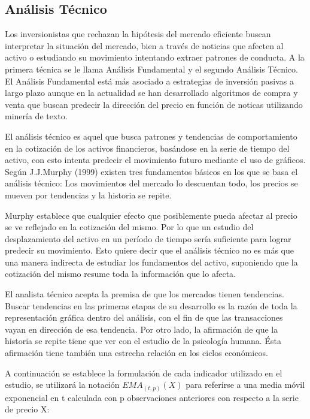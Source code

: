 \documentclass[a4paper,12pt]{Latex/Classes/PhDthesisPSnPDF}
\begin{document}
\subsection{Análisis Técnico}

Los inversionistas que rechazan la hipótesis del mercado eficiente buscan interpretar la situación del mercado, bien a través de noticias que afecten al activo o estudiando su movimiento intentando extraer patrones de conducta. A la primera técnica se le llama Análisis Fundamental y el segundo Análisis Técnico. El Análisis Fundamental está más asociado a estrategias de inversión pasivas a largo plazo aunque en la actualidad se han desarrollado algoritmos de compra y venta que buscan predecir la dirección del precio en función de noticas utilizando minería de texto.

El análisis técnico es aquel que busca patrones y tendencias de comportamiento en la cotización de los activos financieros, basándose en la serie de tiempo del activo, con esto intenta predecir el movimiento futuro mediante el uso de gráficos. Según J.J.Murphy (1999) existen tres fundamentos básicos en los que se basa el análisis técnico: Los movimientos del mercado lo descuentan  todo, los precios se mueven por tendencias y la historia se repite.

Murphy establece que cualquier efecto que posiblemente pueda afectar al precio se ve reflejado en la cotización del mismo. Por lo que un estudio del desplazamiento del activo en un período de tiempo sería suficiente para lograr predecir su movimiento. Esto quiere decir que el análisis técnico no es más que una manera indirecta de estudiar los fundamentos del activo, suponiendo que la cotización del mismo resume toda la información que lo afecta. 

El analista técnico acepta la premisa de que los mercados tienen tendencias. Buscar tendencias en las primeras etapas de su desarrollo es la razón de toda la representación gráfica dentro del análisis, con el fin de que las transacciones vayan en dirección de esa tendencia. Por otro lado, la afirmación de que la historia se repite tiene que ver con el estudio de la psicología humana. Ésta afirmación tiene también una estrecha relación en los ciclos económicos. 

A continuación se establece la formulación de cada indicador utilizado en el estudio, se utilizará la notación $EMA_{(t, p)}(X)$ para referirse a una media móvil exponencial en t calculada con p observaciones anteriores con respecto a la serie de precio X:
\end{document}
